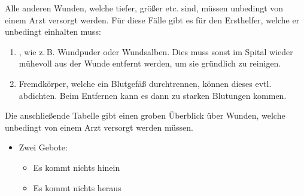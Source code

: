 {
Alle anderen Wunden, welche tiefer, größer etc. sind, müssen
unbedingt von einem Arzt versorgt werden. Für diese Fälle
gibt es  für den Ersthelfer, welche er
unbedingt einhalten muss:

\begin{enumerate}
    \item {}, wie z.\,B. Wundpuder oder Wundsalben. Dies muss sonst im
Spital wieder mühevoll aus der Wunde entfernt werden, um sie
gründlich zu reinigen.
\item {}
Fremdkörper, welche ein Blutgefäß durchtrennen, können
dieses evtl. abdichten. Beim Entfernen kann es dann zu
starken Blutungen kommen.

\end{enumerate}
 Die anschließende
Tabelle gibt einen groben Überblick über Wunden, welche unbedingt von einem
Arzt versorgt werden müssen.
}{
\begin{itemize}
  \item Zwei Gebote:
  \begin{itemize}
    \item Es kommt nichts hinein
    \item Es kommt nichts heraus
  \end{itemize}
\end{itemize}
}{}{}{}

